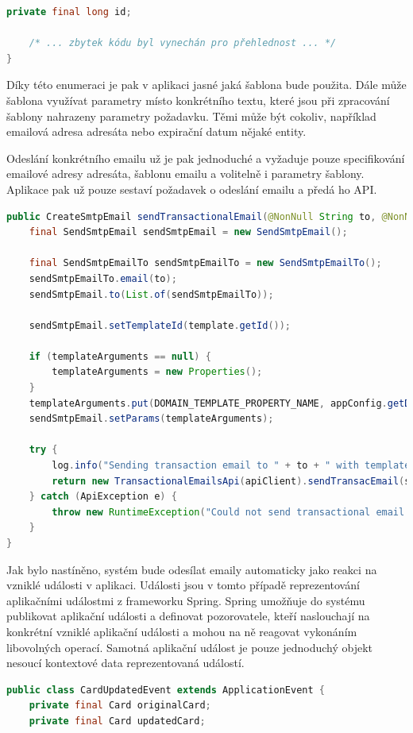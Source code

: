 \begin{itemize}
\begin{itemize}
\begin{lstlisting}[language=Java]
    private final long id;

    /* ... zbytek kódu byl vynechán pro přehlednost ... */
}
		\end{lstlisting}
		Díky této enumeraci je pak v aplikaci jasné jaká šablona bude použita.
		Dále může šablona využívat parametry místo konkrétního textu, které jsou při zpracování šablony nahrazeny
		parametry požadavku.
		Těmi může být cokoliv, například emailová adresa adresáta nebo expirační datum nějaké entity.

		Odeslání konkrétního emailu už je pak jednoduché a vyžaduje pouze specifikování emailové adresy adresáta,
		šablonu emailu a volitelně i parametry šablony.
		Aplikace pak už pouze sestaví požadavek o odeslání emailu a předá ho \ac{API}.
		\begin{lstlisting}[language=Java]
public CreateSmtpEmail sendTransactionalEmail(@NonNull String to, @NonNull EmailTemplate template, Properties templateArguments) {
	final SendSmtpEmail sendSmtpEmail = new SendSmtpEmail();

	final SendSmtpEmailTo sendSmtpEmailTo = new SendSmtpEmailTo();
	sendSmtpEmailTo.email(to);
	sendSmtpEmail.to(List.of(sendSmtpEmailTo));

	sendSmtpEmail.setTemplateId(template.getId());

	if (templateArguments == null) {
		templateArguments = new Properties();
	}
	templateArguments.put(DOMAIN_TEMPLATE_PROPERTY_NAME, appConfig.getDomain());
	sendSmtpEmail.setParams(templateArguments);

	try {
		log.info("Sending transaction email to " + to + " with template " + template + " ...");
		return new TransactionalEmailsApi(apiClient).sendTransacEmail(sendSmtpEmail);
	} catch (ApiException e) {
		throw new RuntimeException("Could not send transactional email to " + to + " with template " + template + ": ", e);
	}
}
		\end{lstlisting}

		Jak bylo nastíněno, systém bude odesílat emaily automaticky jako reakci na vzniklé události v aplikaci.
		Události jsou v tomto případě reprezentování aplikačními událostmi z frameworku Spring.
		Spring umožňuje do systému publikovat aplikační události a definovat pozorovatele, kteří naslouchají na konkrétní
		vzniklé aplikační události a mohou na ně reagovat vykonáním libovolných operací.
		Samotná aplikační událost je pouze jednoduchý objekt nesoucí kontextové data reprezentovaná událostí.
		\begin{lstlisting}[language=Java]
public class CardUpdatedEvent extends ApplicationEvent {
    private final Card originalCard;
    private final Card updatedCard;


\end{lstlisting}
\end{itemize}
\end{itemize}

